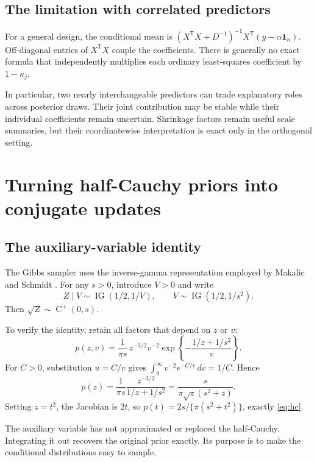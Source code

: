 \documentclass[11pt,letterpaper]{article}
\numberwithin{equation}{section}
\newcommand{\IG}{\operatorname{IG}}
\newcommand{\HC}{\operatorname{C}^{+}}
\newcommand{\given}{\mid}
\newcommand{\ones}{\mathbf{1}}
\newcommand{\trans}{^{\mathsf T}}
\begin{document}
\subsection{The limitation with correlated predictors}

For a general design, the conditional mean is
\((X\trans X+D^{-1})^{-1}X\trans(y-\alpha\ones_n)\). Off-diagonal entries of
\(X\trans X\) couple the coefficients. There is generally no exact formula
that independently multiplies each ordinary least-squares coefficient by
\(1-\kappa_j\).

In particular, two nearly interchangeable predictors can trade explanatory
roles across posterior draws. Their joint contribution may be stable while
their individual coefficients remain uncertain. Shrinkage factors remain
useful scale summaries, but their coordinatewise interpretation is exact only
in the orthogonal setting.

\section{Turning half-Cauchy priors into conjugate updates}\label{sec:augmentation}

\subsection{The auxiliary-variable identity}

The Gibbs sampler uses the inverse-gamma representation employed by Makalic
and Schmidt \cite{makalic2016}. For any \(s>0\), introduce \(V>0\) and write
\begin{equation}\label{eq:identity}
 Z\given V\sim\IG(1/2,1/V),\qquad
 V\sim\IG(1/2,1/s^2).
\end{equation}
Then \(\sqrt Z\sim\HC(0,s)\).

To verify the identity, retain all factors that depend on \(z\) or \(v\):
\[
 p(z,v)=\frac{1}{\pi s}\,z^{-3/2}v^{-2}
       \exp\left\{-\frac{1/z+1/s^2}{v}\right\}.
\]
For \(C>0\), substitution \(u=C/v\) gives
\(\int_0^\infty v^{-2}e^{-C/v}\,dv=1/C\). Hence
\begin{equation}
 p(z)=\frac{1}{\pi s}\frac{z^{-3/2}}{1/z+1/s^2}
     =\frac{s}{\pi\sqrt z(s^2+z)}.
\end{equation}
Setting \(z=t^2\), the Jacobian is \(2t\), so
\(p(t)=2s/\{\pi(s^2+t^2)\}\), exactly \eqref{eq:hc}.

The auxiliary variable has not approximated or replaced the half-Cauchy.
Integrating it out recovers the original prior exactly. Its purpose is to make
the conditional distributions easy to sample.
\end{document}
